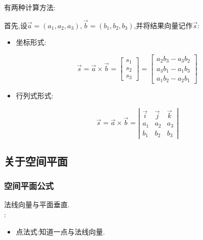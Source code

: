 \documentclass[UTF8,12pt]{ctexbook}
\begin{document}
{{{{      有两种计算方法:

      首先,设$\vec{a} = (a_1,a_2,a_3),\vec{b} = (b_1,b_2,b_3)$,并将结果向量记作$\vec{s}$:

      \begin{itemize}
        \item {
              坐标形式:

              $$
                \vec{s}
                =
                \vec{a}\times\vec{b}
                =
                \begin{bmatrix}
                  s_1 \\
                  s_2 \\
                  s_3
                \end{bmatrix}
                =
                \begin{bmatrix}
                  a_2b_3 - a_3b_2 \\
                  a_3b_1 - a_1b_3 \\
                  a_1b_2 - a_2b_1
                \end{bmatrix}
              $$
              }
        \item {
              行列式形式:

              $$
                \vec{s}
                =
                \vec{a}\times\vec{b}
                =
                \left|\begin{array}{ccc}
                  \vec{i} & \vec{j} & \vec{k} \\
                  a_1     & a_2     & a_3     \\
                  b_1     & b_2     & b_3
                \end{array}\right|
              $$
              }
      \end{itemize}
    }%

  }%

  \subsection{关于空间平面}{

    \subsubsection{空间平面公式}{
      法线向量与平面垂直.\\

      :
      \begin{itemize}
        \item {
              点法式:知道一点与法线向量.

}
\end{itemize}}}}}
\end{document}
